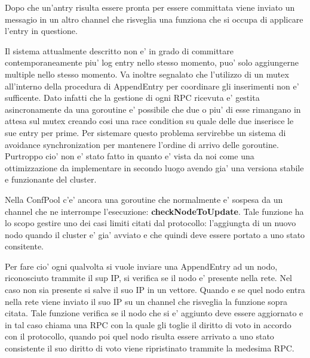 \begin{itemize}
        Dopo che un'antry risulta essere pronta per essere committata viene inviato un messagio
        in un altro channel che risveglia una funziona che si occupa di applicare l'entry in 
        questione.

        Il sistema attualmente descritto non e' in grado di committare contemporaneamente 
        piu' log entry nello stesso momento, puo' solo aggiungerne multiple nello stesso momento.
        Va inoltre segnalato che l'utilizzo di un mutex all'interno della procedura 
        di AppendEntry per coordinare gli inserimenti non e' sufficente. Dato infatti che 
        la gestione di ogni RPC ricevuta e' gestita asincronamente da una goroutine
        e' possibile che due o piu' di esse rimangano in attesa sul mutex creando cosi una race
        condition su quale delle due inserisce le sue entry per prime. Per sistemare questo 
        problema servirebbe un sistema di avoidance synchronization
        per mantenere l'ordine di arrivo delle goroutine.
        Purtroppo cio' non e' stato fatto in quanto e' vista da noi come una ottimizzazione da
        implementare in secondo luogo avendo gia' una versiona stabile e funzionante del cluster.

        Nella ConfPool c'e' ancora una goroutine che normalmente e' sospesa da un channel che ne
        interrompe l'esecuzione: \textbf{checkNodeToUpdate}.
        Tale funzione ha lo scopo gestire uno dei casi limiti citati dal protocollo: l'aggiungta
        di un nuovo nodo quando il cluster e' gia' avviato e che quindi deve essere portato a 
        uno stato consitente.

        Per fare cio' ogni qualvolta si vuole inviare una AppendEntry ad un nodo, riconosciuto
        trammite il sup IP, si verifica se il nodo e' presente nella rete. Nel caso non sia presente
        si salve il suo IP in un vettore.
        Quando e se quel nodo entra nella rete viene inviato il suo IP su un channel che risveglia
        la funzione sopra citata. Tale funzione verifica se il nodo che si e' aggiunto deve essere
        aggiornato e in tal caso chiama una RPC con la quale gli toglie il diritto di voto in accordo
        con il protocollo, quando poi quel nodo risulta essere arrivato a uno stato consistente
        il suo diritto di voto viene ripristinato trammite la medesima RPC.


\end{itemize}
